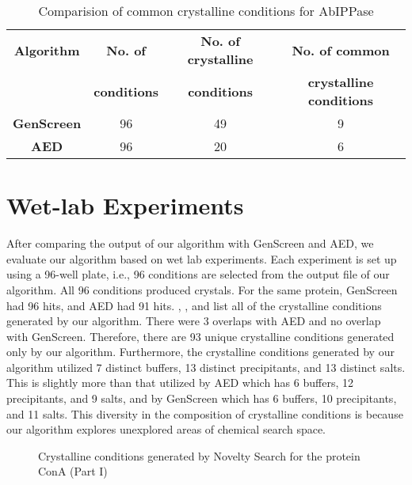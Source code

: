 \begin{table}[htbp]
\begin{center}
\caption{Comparision of common crystalline conditions for AbIPPase}
\begin{tabular}{|c|c|c|c|}
\hline
\textbf{Algorithm} & \textbf{No. of} & \textbf{No. of crystalline} & \textbf{No. of common} \\
 & \textbf{conditions} & \textbf{conditions} & \textbf{crystalline conditions} \\
\hline
\textbf{GenScreen} & 96 & 49 & 9 \\
\hline
\textbf{AED} & 96 & 20 & 6 \\
\hline

\end{tabular}
\label{common_table}
\end{center}
\end{table}


\section{Wet-lab Experiments} \label{sec:results-wet-lab}
After comparing the output of our algorithm with GenScreen and AED, we evaluate our algorithm based on  wet lab experiments. Each experiment is set up using a 96-well plate, i.e., 96 conditions are selected from the output file of our algorithm. All 96 conditions produced crystals. For the same protein, GenScreen had 96 hits, and AED had 91 hits. , , and  list all of the crystalline conditions generated by our algorithm. There were 3 overlaps with AED and no overlap with GenScreen.  Therefore, there are 93 unique crystalline conditions generated only by our algorithm. Furthermore, the crystalline conditions generated by our algorithm utilized 7 distinct buffers, 13 distinct precipitants, and 13 distinct salts. This is slightly more than that utilized by AED which has 6 buffers, 12 precipitants, and 9 salts, and by GenScreen which has 6 buffers, 10 precipitants, and 11 salts. This diversity in the composition of crystalline conditions is because our algorithm explores unexplored areas of chemical search space.
\newpage

\begin{figure}[H]
	\caption{Crystalline conditions generated by Novelty Search for the protein ConA (Part I)}
	\label{fig:crystal1}
\end{figure}

